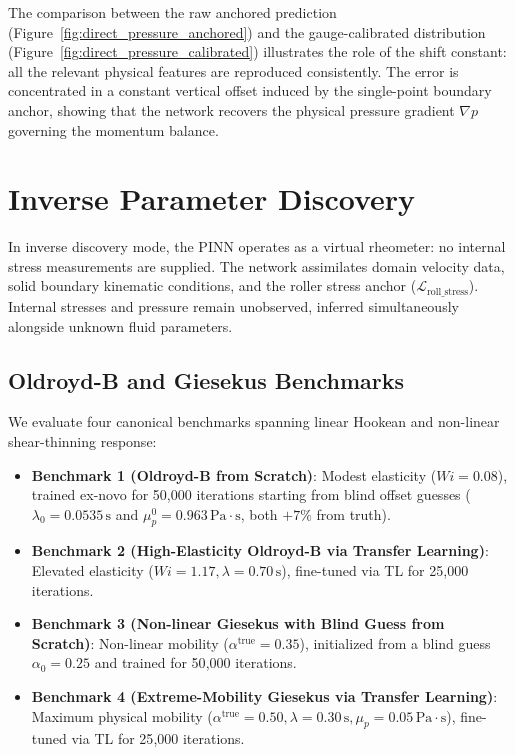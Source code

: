 The comparison between the raw anchored prediction (Figure~\ref{fig:direct_pressure_anchored})
and the gauge-calibrated distribution (Figure~\ref{fig:direct_pressure_calibrated})
illustrates the role of the shift constant: all the relevant physical features are
reproduced consistently. The error is concentrated in a constant vertical offset
induced by the single-point boundary anchor, showing that the network recovers
the physical pressure gradient $\nabla p$ governing the momentum balance.

\section{Inverse Parameter Discovery}
\label{sec:inverse_parameter_discovery}

In inverse discovery mode, the PINN operates as a virtual rheometer: no internal
stress measurements are supplied. The network assimilates domain velocity data,
solid boundary kinematic conditions, and the roller stress anchor
($\mathcal{L}_{\mathrm{roll\_stress}}$). Internal stresses and pressure remain
unobserved, inferred simultaneously alongside unknown fluid parameters.

\subsection{Oldroyd-B and Giesekus Benchmarks}
\label{subsec:parameter_discovery_benchmarks}

We evaluate four canonical benchmarks spanning linear Hookean and non-linear
shear-thinning response:
\begin{itemize}
    \item \textbf{Benchmark 1 (Oldroyd-B from Scratch)}:
        Modest elasticity ($Wi = 0.08$), trained ex-novo for 50{,}000 iterations
        starting from blind offset guesses ($\lambda_0 = 0.0535\,\mathrm{s}$ and
        $\mu_p^0 = 0.963\,\mathrm{Pa\cdot s}$, both $+7\%$ from truth).
    \item \textbf{Benchmark 2 (High-Elasticity Oldroyd-B via Transfer Learning)}:
        Elevated elasticity ($Wi = 1.17, \lambda = 0.70\,\mathrm{s}$), fine-tuned via
        TL for 25{,}000 iterations.
    \item \textbf{Benchmark 3 (Non-linear Giesekus with Blind Guess from Scratch)}:
        Non-linear mobility ($\alpha^{\mathrm{true}} = 0.35$), initialized from a
        blind guess $\alpha_0 = 0.25$ and trained for 50{,}000 iterations.
    \item \textbf{Benchmark 4 (Extreme-Mobility Giesekus via Transfer Learning)}:
        Maximum physical mobility
        ($\alpha^{\mathrm{true}} = 0.50, \lambda = 0.30\,\mathrm{s}, \mu_p = 0.05\,\mathrm{Pa\cdot s}$),
        fine-tuned via TL for 25{,}000 iterations.
\end{itemize}

